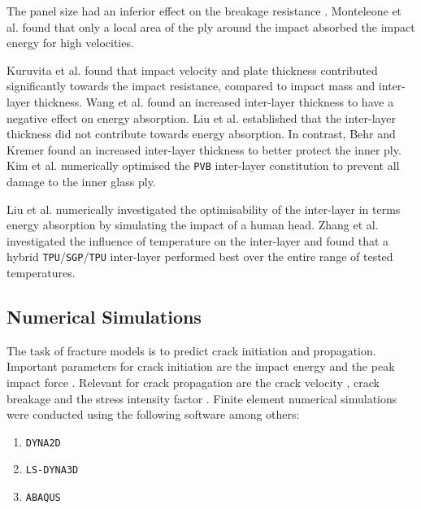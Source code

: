 \documentclass[format=acmsmall, 12pt, screen=true, review=false]{acmart}
\begin{document}
\bigbreak
The panel size had an inferior effect on the breakage resistance \cite{Wan18}. Monteleone et al. \cite{Mon04} found that only a local area of the ply around the impact absorbed the impact energy for high velocities.

\bigbreak
Kuruvita et al. \cite{Kur14} found that impact velocity and plate thickness contributed significantly towards the impact resistance, compared to impact mass and inter-layer thickness. Wang et al. \cite{Wan18} found an increased inter-layer thickness to have a negative effect on energy absorption. Liu et al. \cite{Liu16} established that the inter-layer thickness did not contribute towards energy absorption. In contrast, Behr and Kremer \cite{Beh99} found an increased inter-layer thickness to better protect the inner ply. Kim et al. \cite{Kim16} numerically optimised the \texttt{PVB} inter-layer constitution to prevent all damage to the inner glass ply.

\bigbreak
Liu et al. \cite{Liu16} numerically investigated the optimisability of the inter-layer in terms energy absorption by simulating the impact of a human head. Zhang et al. \cite{Zha19} investigated the influence of temperature on the inter-layer and found that a hybrid \texttt{TPU}/\texttt{SGP}/\texttt{TPU} inter-layer performed best over the entire range of tested temperatures.


\subsection{Numerical Simulations}

The task of fracture models is to predict crack initiation and propagation. Important parameters for crack initiation are the impact energy \cite{Wan18} and the peak impact force \cite{Wan18}. Relevant for crack propagation are the crack velocity \cite{Xu11}, crack breakage \cite{Xu11} and the stress intensity factor \cite{Xu11}. Finite element numerical simulations were conducted using the following software among others:

\begin{enumerate}
    \item \texttt{DYNA2D} \cite{Flo98, Beh99}
    \item \texttt{LS-DYNA3D} \cite{Wu14}
    \item \texttt{ABAQUS} \cite{Kur14, Moh17}
\end{enumerate}
\end{document}
